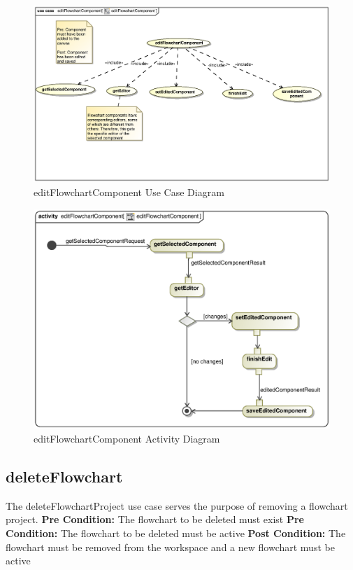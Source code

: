 \documentclass[11pt,a4paper,titlepage]{article}
\begin{document}
\begin{figure}[H]
  \centering
\includegraphics[width=500px]{editFlowchartComponent.eps}
\caption{editFlowchartComponent Use Case Diagram}
\end{figure}

\begin{figure}[H]
  \centering
\includegraphics[width=500px]{editFlowchartComponentActivity.eps}
\caption{editFlowchartComponent Activity Diagram}
\end{figure}

\newpage
\subsection{deleteFlowchart}
The deleteFlowchartProject use case serves the purpose of removing a flowchart project.\newline\newline
\textbf{Pre Condition:} The flowchart to be deleted must exist\newline
\textbf{Pre Condition:} The flowchart to be deleted must be active\newline\newline
\textbf{Post Condition:} The flowchart must be removed from the workspace and a new flowchart must be active
\end{document}
